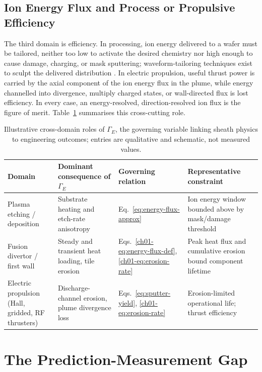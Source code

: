 \subsection{Ion Energy Flux and Process or Propulsive Efficiency}

The third domain is efficiency. In processing, ion energy delivered to a wafer must be tailored, neither too low to activate the desired chemistry nor high enough to cause damage, charging, or mask sputtering; waveform-tailoring techniques exist to sculpt the delivered distribution \cite{ref0105}. In electric propulsion, useful thrust power is carried by the axial component of the ion energy flux in the plume, while energy channelled into divergence, multiply charged states, or wall-directed flux is lost efficiency. In every case, an energy-resolved, direction-resolved ion flux is the figure of merit. Table~\ref{tab:flux-consequences} summarises this cross-cutting role.

\begin{table}[htbp]
\centering
\caption{Illustrative cross-domain roles of $\Gamma_E$, the governing variable linking sheath physics to engineering outcomes; entries are qualitative and schematic, not measured values.}
\label{tab:flux-consequences}
\begin{tabularx}{\textwidth}{@{}l X X X@{}}
\toprule
Domain & Dominant consequence of $\Gamma_E$ & Governing relation & Representative constraint \\
\midrule
Plasma etching / deposition & Substrate heating and etch-rate anisotropy & Eq.~\eqref{eq:energy-flux-approx} & Ion energy window bounded above by mask/damage threshold \\
Fusion divertor / first wall & Steady and transient heat loading, tile erosion & Eqs.~\eqref{ch01-eq:energy-flux-def}, \eqref{ch01-eq:erosion-rate} & Peak heat flux and cumulative erosion bound component lifetime \\
Electric propulsion (Hall, gridded, RF thrusters) & Discharge-channel erosion, plume divergence loss & Eqs.~\eqref{eq:sputter-yield}, \eqref{ch01-eq:erosion-rate} & Erosion-limited operational life; thrust efficiency \\
\bottomrule
\end{tabularx}
\end{table}

\section{The Prediction-Measurement Gap}

